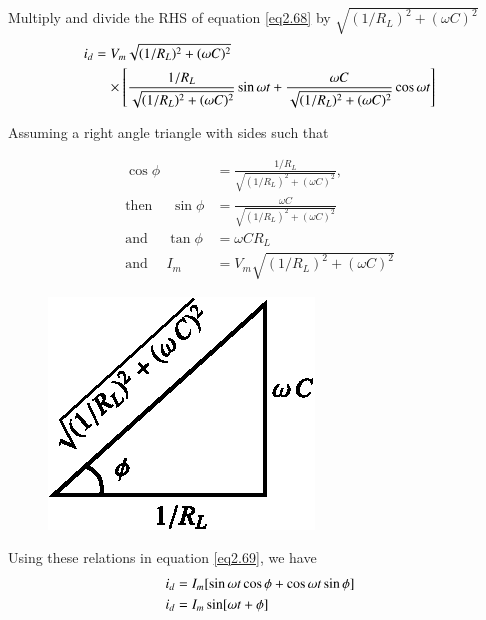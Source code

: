 Multiply and divide the RHS of equation \eqref{eq2.68} by
$\sqrt{(1/R_L)^2 + (\omega C)^2}$
\begin{align}
i_d & = V_m \sqrt{(1/R_L)^2 + (\omega C)^2}\notag\\
& \quad \times \left[\frac{1/R_L}{\sqrt{(1/R_L)^2 + (\omega C)^2}}
  \sin \omega t + \frac{\omega C}{\sqrt{(1/R_L)^2 +(\omega C)^2}} \cos
  \omega t\right] \label{eq2.69}
\end{align}

Assuming a right angle triangle with sides such that 
\begin{center}
\begin{minipage}[c]{9cm}
\begin{align*}
\cos \phi & = \frac{1/R_L}{\sqrt{(1/R_L)^2 + (\omega
    C)^2}}, \\
\text{then } \quad \sin \phi & = \frac{\omega C}{ \sqrt{(1/R_L)^2 +
    (\omega C)^2}}\\
\text{and } \quad \tan \phi & = \omega C R_L \\
 \text{and } \quad I_m  & = V_m \sqrt{(1/R_L)^2 + (\omega C)^2}
\end{align*}
\end{minipage}
\quad
\begin{minipage}[c]{4cm}
\begin{figure}[H]
\centering
\includegraphics{chap2/eqfig1.eps}
\end{figure}
\end{minipage}
\end{center}

Using these relations in equation \eqref{eq2.69}, we have
\begin{align}
i_d & = I_m [\sin \omega t \cos \phi + \cos \omega t \sin \phi] \notag\\
i_d & = I_m \sin [\omega t + \phi] \label{eq2.70}
\end{align}

